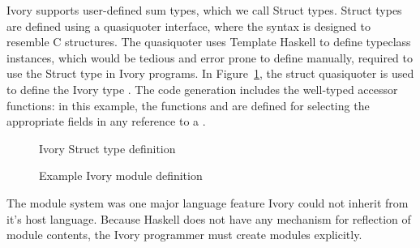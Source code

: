 Ivory supports user-defined sum types, which we call Struct types.  Struct types
are defined using a quasiquoter\cite{ghc-quasiquoter} interface, where the
syntax is designed to resemble C structures. The quasiquoter uses Template
Haskell\cite{ghc-templatehaskell} to define typeclass instances, which would be
tedious and error prone to define manually,  required to use the Struct type in
Ivory programs. In Figure~\ref{fig:structqq}, the struct quasiquoter is used to
define the Ivory type . The code generation includes
the well-typed accessor functions: in this example, the functions  and  are defined for selecting the appropriate fields in any
reference to a .

\begin{figure}
    \begin{smcode}
    \end{smcode}
  \caption{Ivory Struct type definition}
  \label{fig:structqq}
\end{figure}



\newcommand{\mytilde}{\raise.17ex\hbox{$\scriptstyle\mathtt{\sim}$}}
\begin{figure}
  \caption{Example Ivory module definition}
  \label{fig:module}
\end{figure}

The module system was one major language feature Ivory could not inherit from
it's host language. Because Haskell does not have any mechanism for reflection
of module contents, the Ivory programmer must create modules explicitly.

